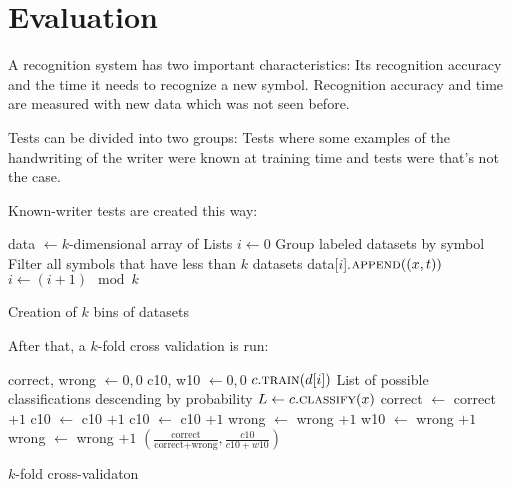 
\chapter{Evaluation}\label{ch:Evaluation}
A recognition system has two important characteristics: Its recognition accuracy
and the time it needs to recognize a new symbol. Recognition accuracy and time
are measured with new data which was not seen before.

Tests can be divided into two groups: Tests where some examples of the handwriting
of the writer were known at training time and tests were that's not the case.

Known-writer tests are created this way:

\begin{algorithm}[h]
    \begin{algorithmic}
        \State data $\gets k$-dimensional array of Lists
        \State $i \gets 0$
        \State Group labeled datasets by symbol
        \State Filter all symbols that have less than $k$ datasets
                \State data[$i$].$\Call{append}{(x, t)}$
                \State $i \gets (i + 1) \mod k$
            \EndFor
        \EndFor
    \end{algorithmic}
\caption{Creation of $k$ bins of datasets}
\label{alg:creation-of-bins}
\end{algorithm}

After that, a $k$-fold cross validation is run:

\begin{algorithm}[h]
    \begin{algorithmic}
            \State correct, wrong $\gets 0, 0$
            \State c10, w10 $\gets 0, 0$
                        \State $c.\Call{train}{d[i]}$
                    \EndIf
                \EndFor
                    \Comment List of possible classifications descending by probability
                    \State $L \gets c.\Call{classify}{x}$
                        \State correct $\gets$ correct $+1$
                        \State c10 $\gets$ c10 $+1$
                        \State c10 $\gets$ c10 $+1$
                        \State wrong $\gets$ wrong $+1$
                    \Else
                        \State w10 $\gets$ wrong $+1$
                        \State wrong $\gets$ wrong $+1$
                    \EndIf
                \EndFor
            \EndFor
            \State \Return $(\frac{\text{correct}}{\text{correct}+\text{wrong}}, \frac{c10}{c10 + w10})$
        \EndFunction
    \end{algorithmic}
\caption{$k$-fold cross-validaton}
\label{alg:k-fold-cross-validation}
\end{algorithm}

